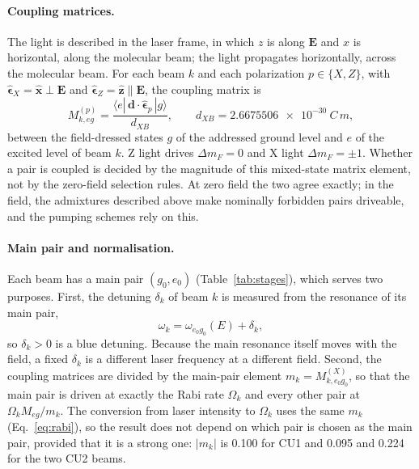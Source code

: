 \documentclass[11pt,a4paper,oneside]{report}
\begin{document}
\paragraph{Coupling matrices.} The light is described in the laser frame, in which $z$ is along
$\mathbf E$ and $x$ is horizontal, along the molecular beam; the light propagates horizontally,
across the molecular beam. For each beam $k$ and each polarization $p\in\{X,Z\}$, with
$\hat{\boldsymbol\epsilon}_X=\hat{\mathbf x}\perp\mathbf E$ and
$\hat{\boldsymbol\epsilon}_Z=\hat{\mathbf z}\parallel\mathbf E$, the coupling matrix is
\begin{equation}
  M^{(p)}_{k,eg}=\frac{\langle e|\,\mathbf d\cdot\hat{\boldsymbol\epsilon}_p\,|g\rangle}{d_{XB}},
  \qquad d_{XB}=\SI{2.6675506e-30}{C\,m},
  \label{eq:M}
\end{equation}
between the field-dressed states $g$ of the addressed ground level and $e$ of the excited level of
beam $k$. Z light drives $\Delta m_F=0$ and X light $\Delta m_F=\pm1$. Whether a pair is coupled is
decided by the magnitude of this mixed-state matrix element, not by the zero-field selection rules.
At zero field the two agree exactly; in the field, the admixtures described above make nominally
forbidden pairs driveable, and the pumping schemes rely on this.

\paragraph{Main pair and normalisation.} Each beam has a main pair $(g_0,e_0)$
(Table~\ref{tab:stages}), which serves two purposes. First, the detuning $\delta_k$ of beam $k$ is
measured from the resonance of its main pair,
\begin{equation}
  \omega_k=\omega_{e_0g_0}(E)+\delta_k,
  \label{eq:detuning}
\end{equation}
so $\delta_k>0$ is a blue detuning. Because the main resonance itself moves with the field, a fixed
$\delta_k$ is a different laser frequency at a different field. Second, the coupling matrices are
divided by the main-pair element $m_k=M^{(X)}_{k,e_0g_0}$, so that the main pair is driven at
exactly the Rabi rate $\Omega_k$ and every other pair at $\Omega_kM_{eg}/m_k$. The conversion from
laser intensity to $\Omega_k$ uses the same $m_k$ (Eq.~\eqref{eq:rabi}), so the result does not
depend on which pair is chosen as the main pair, provided that it is a strong one: $|m_k|$ is 0.100
for CU1 and 0.095 and 0.224 for the two CU2 beams.
\end{document}
